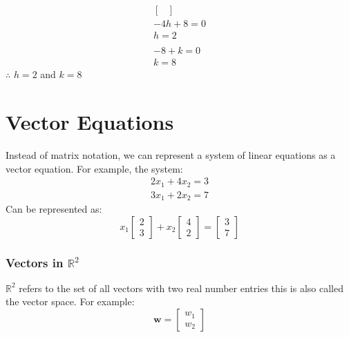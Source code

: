 \documentclass[12pt letter]{report}
\begin{document}
{\begin{enumerate}
\begin{enumerate}
\begin{align*}
\begin{bmatrix}
                    \end{bmatrix} \\
                    -4h + 8 = 0                                       \\
                    h = 2                                             \\
                    \\
                    -8 + k = 0                                        \\
                    k = 8
                  \end{align*}
                  $\therefore$ $h = 2$ and $k = 8$
          \end{enumerate}
  \end{enumerate}
}

\chapter{Vector Equations}

Instead of matrix notation, we can represent a system of linear equations as a vector equation. For example, the system:
\begin{align*}
  2x_1 + 4x_2 = 3 \\
  3x_1 + 2x_2 = 7
\end{align*}
Can be represented as:
\[
  x_1 \begin{bmatrix} 2 \\ 3 \end{bmatrix}  + x_2 \begin{bmatrix} 4 \\ 2 \end{bmatrix}  = \begin{bmatrix} 3 \\ 7  \end{bmatrix}
\]

\subsection{Vectors in $\mathbb{R}^2$}


$\mathbb{R}^{2}$ refers to the set of all vectors with two real number entries this is also called the vector space. For example:
\[
  \mathbf{w} = \begin{bmatrix} w_1 \\ w_2 \end{bmatrix}
\]
\end{document}
